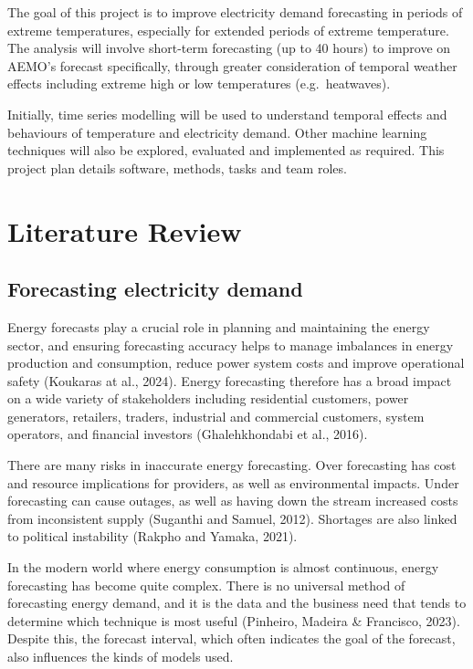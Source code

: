 \documentclass[mstat,12pt,a4paper]{unswthesis}
\begin{document}
The goal of this project is to improve electricity demand forecasting in
periods of extreme temperatures, especially for extended periods of
extreme temperature. The analysis will involve short-term forecasting
(up to 40 hours) to improve on AEMO's forecast specifically, through
greater consideration of temporal weather effects including extreme high
or low temperatures (e.g.~heatwaves).

\bigskip

Initially, time series modelling will be used to understand temporal
effects and behaviours of temperature and electricity demand. Other
machine learning techniques will also be explored, evaluated and
implemented as required. This project plan details software, methods,
tasks and team roles.

\chapter{Literature Review}\label{literature-review}

\section{Forecasting electricity
demand}\label{forecasting-electricity-demand}

\bigskip

Energy forecasts play a crucial role in planning and maintaining the
energy sector, and ensuring forecasting accuracy helps to manage
imbalances in energy production and consumption, reduce power system
costs and improve operational safety (Koukaras at al., 2024). Energy
forecasting therefore has a broad impact on a wide variety of
stakeholders including residential customers, power generators,
retailers, traders, industrial and commercial customers, system
operators, and financial investors (Ghalehkhondabi et al., 2016).

\bigskip

There are many risks in inaccurate energy forecasting. Over forecasting
has cost and resource implications for providers, as well as
environmental impacts. Under forecasting can cause outages, as well as
having down the stream increased costs from inconsistent supply
(Suganthi and Samuel, 2012). Shortages are also linked to political
instability (Rakpho and Yamaka, 2021).

\bigskip

In the modern world where energy consumption is almost continuous,
energy forecasting has become quite complex. There is no universal
method of forecasting energy demand, and it is the data and the business
need that tends to determine which technique is most useful (Pinheiro,
Madeira \& Francisco, 2023). Despite this, the forecast interval, which
often indicates the goal of the forecast, also influences the kinds of
models used.
\end{document}
